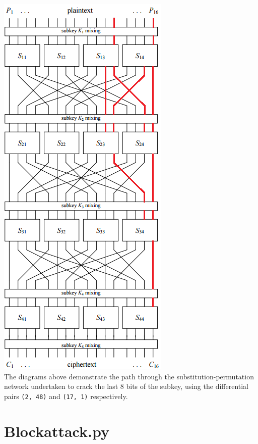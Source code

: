 \documentclass[british,11pt,a4paper]{article}
\begin{document}
\begin{appendices}
  \includegraphics{17,1}
    \\ 
  \hspace{1cm}
  The diagrams above demonstrate the path through the substitution-permutation network undertaken to crack the last 8 bits of the subkey, using the differential pairs \lstinline{(2, 48)} and \lstinline{(17, 1)} respectively.
  \clearpage

  \section{Blockattack.py}\label{app:blockattack}
  
\end{appendices}
\clearpage


\end{document}
